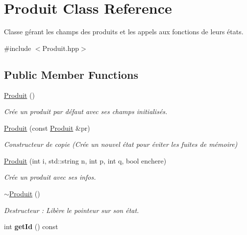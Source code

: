 \hypertarget{classProduit}{\section{Produit Class Reference}
\label{classProduit}
}


Classe gérant les champs des produits et les appels aux fonctions de leurs états.  




{\ttfamily \#include $<$Produit.\-hpp$>$}

\subsection*{Public Member Functions}
\begin{DoxyCompactItemize}
\item 
\hyperlink{classProduit_af2869859ed8b99b3034ae92db555914b}{Produit} ()
\begin{DoxyCompactList}\small\item\em Crée un produit par défaut avec ses champs initialisés. \end{DoxyCompactList}\item 
\hypertarget{classProduit_a10b8f1a05c4308a24b14861310e7a344}{\hyperlink{classProduit_a10b8f1a05c4308a24b14861310e7a344}{Produit} (const \hyperlink{classProduit}{Produit} \&pr)}\label{classProduit_a10b8f1a05c4308a24b14861310e7a344}

\begin{DoxyCompactList}\small\item\em Constructeur de copie (Crée un nouvel état pour éviter les fuites de mémoire) \end{DoxyCompactList}\item 
\hyperlink{classProduit_aacb79a75a6e14e6ac99f82f4736fcb07}{Produit} (int i, std\-::string n, int p, int q, bool enchere)
\begin{DoxyCompactList}\small\item\em Crée un produit avec ses infos. \end{DoxyCompactList}\item 
\hypertarget{classProduit_a7b789cfa3048436fd050cb565b499c03}{\hyperlink{classProduit_a7b789cfa3048436fd050cb565b499c03}{$\sim$\-Produit} ()}\label{classProduit_a7b789cfa3048436fd050cb565b499c03}

\begin{DoxyCompactList}\small\item\em Destructeur \-: Libère le pointeur sur son état. \end{DoxyCompactList}\item 
\hypertarget{classProduit_a2c34d537936017da342429d9f35060ea}{int {\bfseries get\-Id} () const }\label{classProduit_a2c34d537936017da342429d9f35060ea}


\end{DoxyCompactItemize}
